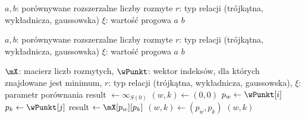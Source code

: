 \documentclass[a4paper,twoside,12pt]{book}
\begin{document}
\begin{algorithm}[t]
	\caption{Minimum rozmyte}
	\label{alg:fuzzy-min}
	\begin{algorithmic}[1]
		\Require $a, b$: porównywane rozszerzalne liczby rozmyte
		\Require $r$: typ relacji (trójkątna, wykładnicza, gaussowska)
		\Require $\xi$: wartość progowa
		\State \Return $a$
		\Else
		\State \Return $b$
		\EndIf
		\EndProcedure
	\end{algorithmic}
\end{algorithm}

\begin{algorithm}[t]
	\caption{Maksimum rozmyte}
	\label{alg:fuzzy-max}
	\begin{algorithmic}[1]
		\Require $a, b$: porównywane rozszerzalne liczby rozmyte
		\Require $r$: typ relacji (trójkątna, wykładnicza, gaussowska)
		\Require $\xi$: wartość progowa
		\State \Return $a$
		\Else
		\State \Return $b$
		\EndIf
		\EndProcedure
	\end{algorithmic}
\end{algorithm}

\begin{algorithm}[t]
	\caption{Rozmyta funkcja $\arg\min$}
	\label{alg:fuzzy-argmin}
	\begin{algorithmic}[1]
		\Require $\mX$: macierz liczb rozmytych, $\wPunkt$: wektor indeksów, dla których znajdowane jest minimum, $r$: typ relacji (trójkątna, wykładnicza, gaussowska), $\xi$: parametr porównania 
		\State result $\gets \infty_{S(0)}$  
		\State $(w, k) \gets (0, 0)$  
		\State $p_w \gets \wPunkt[i]$
		\State $p_k \gets \wPunkt[j]$
		\State result $\gets \mX[p_w][p_k]$
		\State $(w, k) \gets (p_w, p_k)$
		\EndIf
		\EndFor
		\EndFor
		\State \Return $(w, k)$  
		\EndProcedure
	\end{algorithmic}
\end{algorithm}
\end{document}

